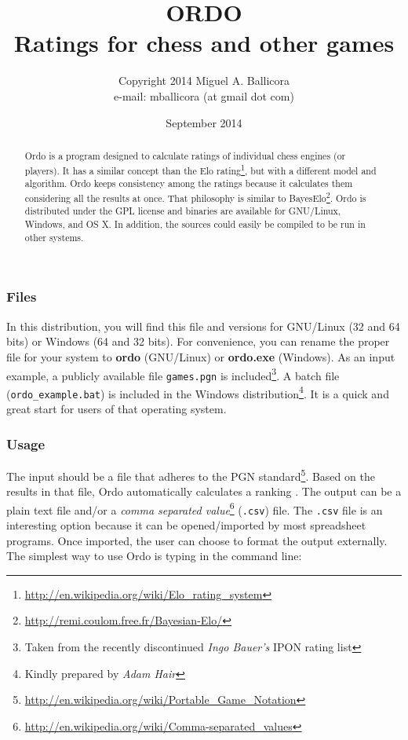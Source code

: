 \documentclass[12pt]{article}
\title{ORDO  \\ Ratings for chess and other games}
\author{Copyright \cpyrht{} 2014 Miguel A. Ballicora\\e-mail: mballicora (at gmail dot com)}
\date{September 2014}
\newcommand{\rgstrd} {\textsuperscript{\textregistered{}}}
\newcommand{\person} [1] {\textit{#1}}
\newcommand{\filename} [1] {\texttt{#1}}
\begin{document}
   \maketitle

\begin{abstract}
Ordo is a program designed to calculate ratings of individual chess engines (or players).
It has a similar concept than the Elo rating\footnote{\url{http://en.wikipedia.org/wiki/Elo_rating_system}}, but with a different model and algorithm. 
Ordo keeps consistency among the ratings because it calculates them considering all the results at once.
That philosophy is similar to BayesElo\footnote{\url{http://remi.coulom.free.fr/Bayesian-Elo/}}.
Ordo is distributed under the GPL license and binaries are available for GNU/Linux, Windows\rgstrd{}, and OS X.
In addition, the sources could easily be compiled to be run in other systems. 
\end{abstract}

\subsubsection*{Files}
In this distribution, you will find this file and versions for GNU/Linux (32 and 64 bits) or Windows\rgstrd{} (64 and 32 bits). 
For convenience, you can rename the proper file for your system to \textbf{ordo} (GNU/Linux) or \textbf{ordo.exe} (Windows\rgstrd{}). 
As an input example, a publicly available file \filename{games.pgn} is included\footnote{Taken from the recently discontinued \person{Ingo Bauer's} IPON rating list}. 
A batch file (\filename{ordo\_example.bat}) is included in the Windows\rgstrd{} distribution\footnote{Kindly prepared by \person{Adam Hair}}. 
It is a quick and great start for users of that operating system.

\subsubsection*{Usage}
The input should be a file that adheres to the PGN standard\footnote{\url{http://en.wikipedia.org/wiki/Portable_Game_Notation}}. 
Based on the results in that file, Ordo automatically calculates a ranking . 
The output can be a plain text file and/or a \textit{comma separated value}\footnote{\url{http://en.wikipedia.org/wiki/Comma-separated_values}} (\filename{.csv}) file.
The \filename{.csv} file is an interesting option because it can be opened/imported by most spreadsheet programs. 
Once imported, the user can choose to format the output externally.
The simplest way to use Ordo is typing in the command line:
\end{document}
